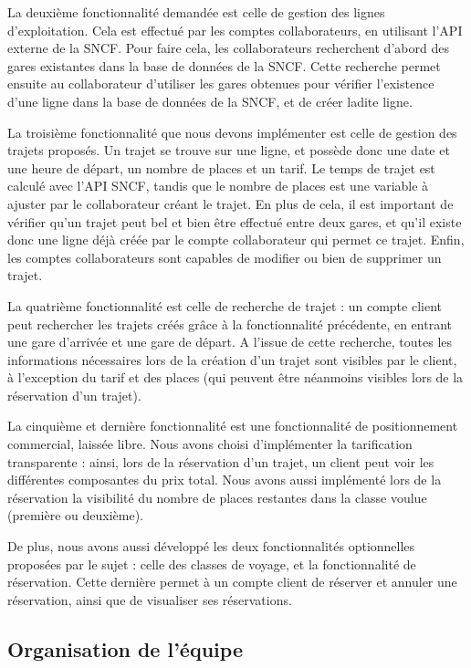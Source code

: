 \documentclass[
  french,
  11pt,
  letterpaper,
  DIV=11,
  numbers=noendperiod]{scrartcl}
\begin{document}
La deuxième fonctionnalité demandée est celle de gestion des lignes
d'exploitation. Cela est effectué par les comptes collaborateurs, en
utilisant l'API externe de la SNCF. Pour faire cela, les collaborateurs
recherchent d'abord des gares existantes dans la base de données de la
SNCF. Cette recherche permet ensuite au collaborateur d'utiliser les
gares obtenues pour vérifier l'existence d'une ligne dans la base de
données de la SNCF, et de créer ladite ligne.

La troisième fonctionnalité que nous devons implémenter est celle de
gestion des trajets proposés. Un trajet se trouve sur une ligne, et
possède donc une date et une heure de départ, un nombre de places et un
tarif. Le temps de trajet est calculé avec l'API SNCF, tandis que le
nombre de places est une variable à ajuster par le collaborateur créant
le trajet. En plus de cela, il est important de vérifier qu'un trajet
peut bel et bien être effectué entre deux gares, et qu'il existe donc
une ligne déjà créée par le compte collaborateur qui permet ce trajet.
Enfin, les comptes collaborateurs sont capables de modifier ou bien de
supprimer un trajet.

La quatrième fonctionnalité est celle de recherche de trajet : un compte
client peut rechercher les trajets créés grâce à la fonctionnalité
précédente, en entrant une gare d'arrivée et une gare de départ. A
l'issue de cette recherche, toutes les informations nécessaires lors de
la création d'un trajet sont visibles par le client, à l'exception du
tarif et des places (qui peuvent être néanmoins visibles lors de la
réservation d'un trajet).

La cinquième et dernière fonctionnalité est une fonctionnalité de
positionnement commercial, laissée libre. Nous avons choisi
d'implémenter la tarification transparente : ainsi, lors de la
réservation d'un trajet, un client peut voir les différentes composantes
du prix total. Nous avons aussi implémenté lors de la réservation la
visibilité du nombre de places restantes dans la classe voulue (première
ou deuxième).

De plus, nous avons aussi développé les deux fonctionnalités
optionnelles proposées par le sujet : celle des classes de voyage, et la
fonctionnalité de réservation. Cette dernière permet à un compte client
de réserver et annuler une réservation, ainsi que de visualiser ses
réservations.

\subsection{Organisation de l'équipe}\label{organisation-de-luxe9quipe}
\end{document}
